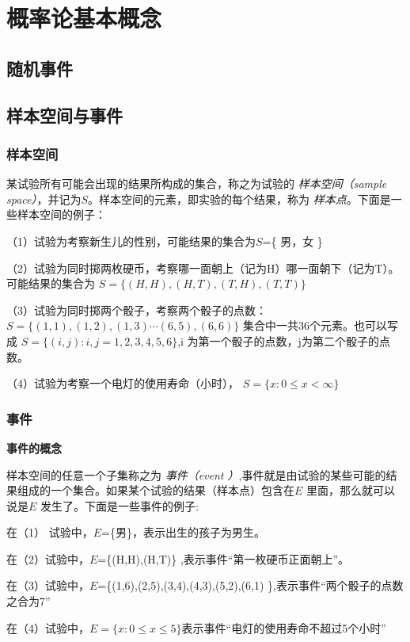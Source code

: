 \section{概率论基本概念}
\subsection{随机事件}

\subsection{样本空间与事件}

\subsubsection{样本空间}

某试验所有可能会出现的结果所构成的集合，称之为试验的\textit{ 样本空间（sample space）}，并记为$S$。样本空间的元素，即实验的每个结果，称为\textit{ 样本点}。下面是一些样本空间的例子：

（1）试验为考察新生儿的性别，可能结果的集合为$S$=\{ 男，女 \}

（2）试验为同时掷两枚硬币，考察哪一面朝上（记为H）哪一面朝下（记为T）。可能结果的集合为 $S = \{ (H,H),(H,T),(T,H),(T,T)\} $

（3）试验为同时掷两个骰子，考察两个骰子的点数：$S = \{ (1,1),(1,2),(1,3) \cdots  (6,5),(6,6)\}$ 集合中一共36个元素。也可以写成 $ S = \{ (i,j) : i,j = 1,2,3,4,5,6 \}$,i 为第一个骰子的点数，j为第二个骰子的点数。

（4）试验为考察一个电灯的使用寿命（小时）， $S = \{ x : 0 \leqslant x < \infty  \}$

\subsubsection{事件}

\textbf{事件的概念}

样本空间的任意一个子集称之为\textit{ 事件（event ）},事件就是由试验的某些可能的结果组成的一个集合。如果某个试验的结果（样本点）包含在$E$ 里面，那么就可以说是$E$ 发生了。下面是一些事件的例子:

在（1） 试验中，$E$=\{男\}，表示出生的孩子为男生。

在（2）试验中，$E$=\{(H,H),(H,T)\} ,表示事件“第一枚硬币正面朝上”。

在（3）试验中，$E$=\{(1,6),(2,5),(3,4),(4,3),(5,2),(6,1) \},表示事件“两个骰子的点数之合为7”

在（4）试验中，$E=\{x: 0 \leqslant x \leqslant 5 \}$表示事件“电灯的使用寿命不超过5个小时” \par\vspace{\baselineskip}

